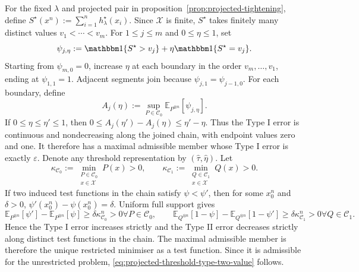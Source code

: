 \documentclass[journal,10pt,draftclsnofoot,onecolumn]{IEEEtran}
\begin{document}
\begin{IEEEproof}
For the fixed $\lambda$ and projected pair in proposition~\ref{prop:projected-tightening}, define $S^\star(x^n):=\sum_{i=1}^n h_\lambda^\star(x_i).$ Since $\mathcal X$ is finite, $S^\star$ takes finitely many distinct values $v_1<\cdots<v_m.$ For $1\leq j\leq m$ and $0\leq\eta\leq1$, set
\begin{equation*}
\psi_{j,\eta}:=\mathbbm 1\{S^\star>v_j\}+\eta\mathbbm 1\{S^\star=v_j\}.
\end{equation*}
Starting from $\psi_{m,0}=0$, increase $\eta$ at each boundary in the order $v_m,\ldots,v_1$, ending at $\psi_{1,1}=1$. Adjacent segments join because $\psi_{j,1}=\psi_{j-1,0}$. For each boundary, define
\begin{equation*}
A_j(\eta):=\sup_{P\in\mathcal C_0} \mathbb E_{P^{\otimes n}}\left[\psi_{j,\eta}\right].
\end{equation*}
If $0\leq\eta\leq\eta'\leq1$, then $0\leq A_j(\eta')-A_j(\eta)\leq\eta'-\eta.$
Thus the Type I error is continuous and nondecreasing along the joined chain, with endpoint values zero and one. It therefore has a maximal admissible member whose Type I error is exactly $\varepsilon$. Denote any threshold representation by $(\widehat\tau,\widehat\eta)$. Let
\begin{equation*}
\kappa_{\mathcal C_0}:=\min_{\substack{P\in\mathcal C_0\\x\in\mathcal X}} P(x)>0,\qquad \kappa_{\mathcal C_1} :=\min_{\substack{Q\in\mathcal C_1\\x\in\mathcal X}} Q(x)>0.
\end{equation*}
If two induced test functions in the chain satisfy $\psi<\psi'$, then for some $x_0^n$ and $\delta>0$, $\psi'(x_0^n)-\psi(x_0^n)=\delta.$ Uniform full support gives
\begin{equation*}
\mathbb E_{P^{\otimes n}}[\psi']-\mathbb E_{P^{\otimes n}}[\psi]\geq\delta\kappa_{\mathcal C_0}^n >0 \forall P\in\mathcal C_0,\qquad \mathbb E_{Q^{\otimes n}}[1-\psi]-\mathbb E_{Q^{\otimes n}}[1-\psi'] \geq \delta\kappa_{\mathcal C_1}^n>0\forall Q\in\mathcal C_1.
\end{equation*}
Hence the Type I error increases strictly and the Type II error decreases strictly along distinct test functions in the chain. The maximal admissible member is therefore the unique restricted minimiser as a test function. Since it is admissible for the unrestricted problem, \eqref{eq:projected-threshold-type-two-value} follows.
\end{IEEEproof}
\end{document}

